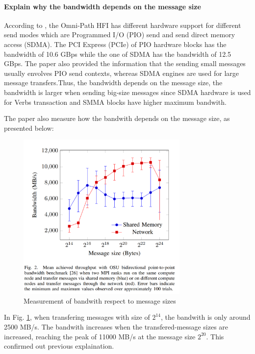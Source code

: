 \documentclass[article]{scrartcl}
\begin{document}
\paragraph{ Explain why the bandwidth depends on the message size}
According to \cite{Mark16}, the Omni-Path HFI has different hardware support for different send modes which are Programmed I/O (PIO) send and send direct memory access (SDMA). 
The PCI Express (PCIe) of PIO hardware blocks has the bandwidth of 10.6 GBps while the one of SDMA has the bandwidth of 12.5 GBps. The paper also provided the information that the sending small messages usually envolves PIO send contexts, whereas SDMA engines are used for large message transfers.Thus, the bandwidth depends on the message size, the bandwidth is larger when sending big-size messages since SDMA hardware is used for Verbs transaction and SMMA blocks have higher maximum bandwith.

The paper \cite{Taffet19} also measure how the bandwith depends on the message size, as presented below:
\begin{figure}[htpb]
    \centering
    \includegraphics[width=0.75\textwidth,keepaspectratio=true]{../figs/3_bandwith_vs_size.png}
    \caption{Measurement of bandwith respect to message sizes \cite{Taffet19}}
    \label{fig:bandwith1}
\end{figure}
In Fig. \ref{fig:bandwith1}, when transfering messages with size of $2^{14}$, the bandwith is only around 2500 MB/s. The bandwith increases when the transfered-message sizes are increased, reaching the peak of 11000 MB/s at the message size $2^20$. This confirmed out previous explaination.
\end{document}
